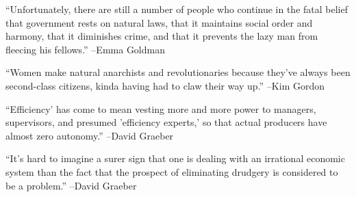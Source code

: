 \documentclass{article}%
\begin{document}
\linebreak%
\vspace{1mm}%
\begin{minipage}{\textwidth}%
\flushleft%
“Unfortunately, there are still a number of people who continue in the fatal belief that government rests on natural laws, that it maintains social order and harmony, that it diminishes crime, and that it prevents the lazy man from fleecing his fellows.”%
\linebreak%
\vspace{1mm}%
–Emma Goldman%
\linebreak%
\vspace{1mm}%
\end{minipage}%
\linebreak%
\vspace{1mm}%
\begin{minipage}{\textwidth}%
\flushleft%
“Women make natural anarchists and revolutionaries because they've always been second{-}class citizens, kinda having had to claw their way up.”%
\linebreak%
\vspace{1mm}%
–Kim Gordon%
\linebreak%
\vspace{1mm}%
\end{minipage}%
\linebreak%
\vspace{1mm}%
\begin{minipage}{\textwidth}%
\flushleft%
“Efficiency' has come to mean vesting more and more power to managers, supervisors, and presumed 'efficiency experts,' so that actual producers have almost zero autonomy.”%
\linebreak%
\vspace{1mm}%
–David Graeber%
\linebreak%
\vspace{1mm}%
\end{minipage}%
\linebreak%
\vspace{1mm}%
\begin{minipage}{\textwidth}%
\flushleft%
“It's hard to imagine a surer sign that one is dealing with an irrational economic system than the fact that the prospect of eliminating drudgery is considered to be a problem.”%
\linebreak%
\vspace{1mm}%
–David Graeber%
\linebreak%
\vspace{1mm}%
\end{minipage}%
\end{document}
